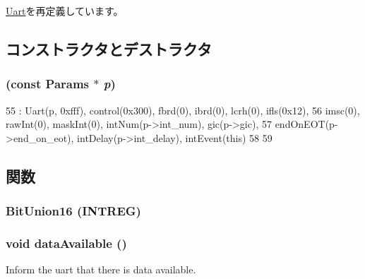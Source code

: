\hyperlink{classUart_a20a580db9778bd0604704c3c6baabfa6}{Uart}を再定義しています。

\subsection{コンストラクタとデストラクタ}
\hypertarget{classPl011_ade5d2e96a72a0f063620be79a21dd12e}{
\subsubsection[{Pl011}]{ (const {\bf Params} $\ast$ {\em p})}}
\label{classPl011_ade5d2e96a72a0f063620be79a21dd12e}



\begin{DoxyCode}
55     : Uart(p, 0xfff), control(0x300), fbrd(0), ibrd(0), lcrh(0), ifls(0x12),
56       imsc(0), rawInt(0), maskInt(0), intNum(p->int_num), gic(p->gic),
57       endOnEOT(p->end_on_eot), intDelay(p->int_delay), intEvent(this)
58 {
59 }
\end{DoxyCode}


\subsection{関数}
\hypertarget{classPl011_a0afce67c547c76c56a13cfc7323fe124}{
\subsubsection[{BitUnion16}]{\setlength{\rightskip}{0pt plus 5cm}BitUnion16 (INTREG)}}
\label{classPl011_a0afce67c547c76c56a13cfc7323fe124}
\hypertarget{classPl011_a603e184f4f31471b76cff54303262aa8}{
\subsubsection[{dataAvailable}]{\setlength{\rightskip}{0pt plus 5cm}void dataAvailable ()}}
\label{classPl011_a603e184f4f31471b76cff54303262aa8}
Inform the uart that there is data available. 

